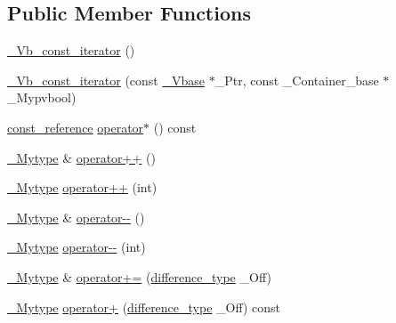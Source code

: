 \subsection*{Public Member Functions}
\begin{DoxyCompactItemize}
\item 
\hyperlink{class___vb__const__iterator_adb285202be4920471e0ee9621c2fb31f}{\+\_\+\+Vb\+\_\+const\+\_\+iterator} ()
\item 
\hyperlink{class___vb__const__iterator_a0aa36f9fb0c9ed18175744370fdf4f42}{\+\_\+\+Vb\+\_\+const\+\_\+iterator} (const \hyperlink{vector_8h_a1555a2f621ba9ade75bb9ce8bca77144}{\+\_\+\+Vbase} $\ast$\+\_\+\+Ptr, const \+\_\+\+Container\+\_\+base $\ast$\+\_\+\+Mypvbool)
\item 
\hyperlink{class___vb__const__iterator_a7115c71f1b57c74be5291ce71b94b101}{const\+\_\+reference} \hyperlink{class___vb__const__iterator_aed5662d460401be6fcae3b5a50695e4c}{operator$\ast$} () const 
\item 
\hyperlink{class___vb__const__iterator_acab47f643a88497fc0bb9c74afc59fde}{\+\_\+\+Mytype} \& \hyperlink{class___vb__const__iterator_a7a85954cff3e2e8db90398ffac4dee9b}{operator++} ()
\item 
\hyperlink{class___vb__const__iterator_acab47f643a88497fc0bb9c74afc59fde}{\+\_\+\+Mytype} \hyperlink{class___vb__const__iterator_abac73057e3eb687e73b4b25d2732cf8a}{operator++} (int)
\item 
\hyperlink{class___vb__const__iterator_acab47f643a88497fc0bb9c74afc59fde}{\+\_\+\+Mytype} \& \hyperlink{class___vb__const__iterator_a87d219cd9f573a1dc899a7653232aa4a}{operator-\/-\/} ()
\item 
\hyperlink{class___vb__const__iterator_acab47f643a88497fc0bb9c74afc59fde}{\+\_\+\+Mytype} \hyperlink{class___vb__const__iterator_af75c7595c4e4823e1200ddddf7b46c33}{operator-\/-\/} (int)
\item 
\hyperlink{class___vb__const__iterator_acab47f643a88497fc0bb9c74afc59fde}{\+\_\+\+Mytype} \& \hyperlink{class___vb__const__iterator_adbd033cd0097cc9506216b21e42c82e1}{operator+=} (\hyperlink{class___vb__const__iterator_a5966ee8cd6e57759253addfa4821de91}{difference\+\_\+type} \+\_\+\+Off)
\item 
\hyperlink{class___vb__const__iterator_acab47f643a88497fc0bb9c74afc59fde}{\+\_\+\+Mytype} \hyperlink{class___vb__const__iterator_adf5c43eda935b3b93d09ece16403e054}{operator+} (\hyperlink{class___vb__const__iterator_a5966ee8cd6e57759253addfa4821de91}{difference\+\_\+type} \+\_\+\+Off) const 
\item 

\end{DoxyCompactItemize}
